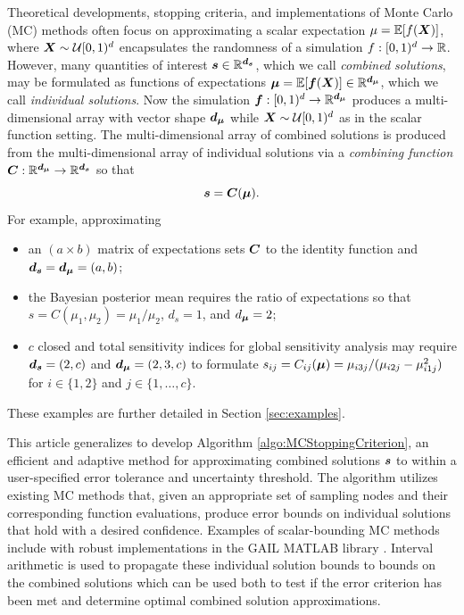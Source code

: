\documentclass{article}[12pt]
\begin{document}
Theoretical developments, stopping criteria, and implementations of Monte Carlo (MC) methods often focus on approximating a scalar expectation $\mu = \mathbb{E}[f(\boldsymbol{X})]$, where $\boldsymbol{X} \sim \mathcal{U}[0,1)^d$ encapsulates the randomness of a simulation $f: [0,1)^d \to \mathbb{R}$. However, many quantities of interest $\boldsymbol{s} \in \mathbb{R}^{\boldsymbol{d}_{\boldsymbol{s}}}$, which we call \emph{combined solutions}, may be formulated as functions of expectations $\boldsymbol{\mu} = \mathbb{E}[\boldsymbol{f}(\boldsymbol{X})] \in \mathbb{R}^{\boldsymbol{d}_{\boldsymbol{\mu}}}$, which we call \emph{individual solutions}. Now the simulation $\boldsymbol{f}: [0,1)^{d} \to \mathbb{R}^{\boldsymbol{d}_{\boldsymbol{\mu}}}$ produces a multi-dimensional array with vector shape $\boldsymbol{d}_{\boldsymbol{\mu}}$ while $\boldsymbol{X} \sim \mathcal{U}[0,1)^d$ as in the scalar function setting. The multi-dimensional array of combined solutions is produced from the multi-dimensional array of individual solutions via a \emph{combining function} $\boldsymbol{C}: \mathbb{R}^{\boldsymbol{d}_{\boldsymbol{\mu}}} \to \mathbb{R}^{\boldsymbol{d}_{\boldsymbol{s}}}$ so that 
\begin{equation}
    \boldsymbol{s} = \boldsymbol{C}(\boldsymbol{\mu}).
    \label{eq:comb_from_indv}
\end{equation}
For example, approximating
\begin{itemize}
    \item an $(a \times b)$ matrix of expectations sets $\boldsymbol{C}$ to the identity function and $\boldsymbol{d}_{\boldsymbol{s}} = \boldsymbol{d}_{\boldsymbol{\mu}} = (a,b)$;
    \item the Bayesian posterior mean requires the ratio of expectations so that $s = C(\mu_1,\mu_2) = \mu_1/\mu_2$, $d_s = 1$, and $d_{\boldsymbol{\mu}} = 2$;
    \item $c$ closed and total sensitivity indices for global sensitivity analysis may require $\boldsymbol{d}_{\boldsymbol{s}} = (2,c)$ and $\boldsymbol{d}_{\boldsymbol{\mu}} = (2,3,c)$ to formulate $s_{ij} = C_{ij}(\boldsymbol{\mu}) =  \mu_{i3j}/(\mu_{i2j}-\mu_{i1j}^2)$ for $i \in \{1,2\}$ and $j \in \{1,\dots,c\}$.
\end{itemize}
These examples are further detailed in Section \ref{sec:examples}.

This article generalizes \cite{adaptive_qmc} to develop Algorithm \ref{algo:MCStoppingCriterion}, an efficient and adaptive method for approximating combined solutions $\boldsymbol{s}$ to within a user-specified error tolerance and uncertainty threshold. The algorithm utilizes existing MC  methods that, given an appropriate set of sampling nodes and their corresponding function evaluations, produce error bounds on individual solutions that hold with a desired confidence. Examples of scalar-bounding MC methods include \cite{cubmcg,cubqmclattice,cubqmcsobol,cubqmcbayes_thesis,cubqmcbayeslattice} with robust implementations in the GAIL MATLAB library \cite{GAIL}. Interval arithmetic is used to propagate these individual solution bounds to bounds on the combined solutions which can be used both to test if the error criterion has been met and determine optimal combined solution approximations. 
\end{document}
